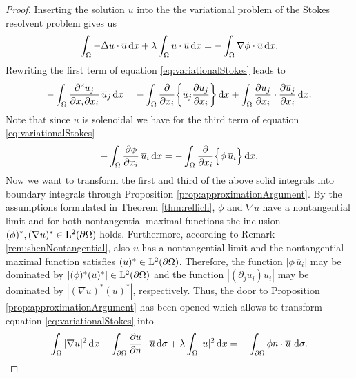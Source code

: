 \begin{proof}
  Inserting the solution $u$ into the the variational problem of the Stokes resolvent problem gives us
  \begin{align}
    \label{eq:variationalStokes}
    \int_\Omega -\Delta u \cdot \overline u \, {\operatorname{d}\!{x}} + \lambda \int_\Omega u \cdot \overline u \, {\operatorname{d}\!{x}}= - \int_\Omega \nabla \phi \cdot \overline u \, {\operatorname{d}\!{x}}.
  \end{align}
  Rewriting the first term of equation \eqref{eq:variationalStokes} leads to 
  \begin{align*}
    -\int_{\Omega}  \frac{\partial^2 u_j}{\partial x_i \partial x_i}  \, \overline u_j \, {\operatorname{d}\!{x}}
    = -\int_{\Omega}  \frac{\partial }{\partial x_i} \bigg\{ \overline u_j \frac{\partial u_j}{\partial x_i} \bigg\} \, {\operatorname{d}\!{x}} + \int_\Omega \frac{\partial u_j}{\partial x_i} \cdot \frac{\partial \overline u_j}{\partial x_i} \, {\operatorname{d}\!{x}}.
    \end{align*}
  Note that since $u$ is solenoidal we have for the third term of equation \eqref{eq:variationalStokes}
  \begin{align*}
    - \int_{\Omega} \frac{\partial \phi}{\partial x_i} \, \overline u_i \, {\operatorname{d}\!{x}} = - \int_{\Omega} \frac{\partial}{\partial x_i} \Big\{ \phi\,  \overline u_i \Big\} \, {\operatorname{d}\!{x}}.
  \end{align*}
  Now we want to transform the first and third of the above solid integrals into boundary integrals through Proposition \ref{prop:approximationArgument}.
  By the assumptions formulated in Theorem \ref{thm:rellich}, $\phi$ and $\nabla u$ have a nontangential limit and for both nontangential maximal functions the inclusion $(\phi)^*, (\nabla u)^* \in \mathrm{L}^2(\partial\Omega)$ holds. 
  Furthermore, according to Remark \ref{rem:shenNontangential}, also $u$ has a nontangential limit and the nontangential maximal function satisfies $(u)^* \in \mathrm{L}^2(\partial\Omega)$. 
  Therefore, the function $|\phi\,  \overline u_i |$ may be dominated by $|(\phi)^* (u)^*| \in \mathrm{L}^2(\partial\Omega)$ and the function $|(\partial_j u_i) u_i|$ may be dominated by $|(\nabla u)^* (u)^*|$, respectively. Thus, the door to Proposition \ref{prop:approximationArgument} has been opened which allows to transform equation \eqref{eq:variationalStokes} into
  \begin{align*}
    \int_\Omega |\nabla u|^2 \, {\operatorname{d}\!{x}} - \int_{\partial\Omega} \frac{\partial u}{\partial n} \cdot \overline u \, {\operatorname{d}\!{\sigma}} + \lambda \int_\Omega |u|^2 \, {\operatorname{d}\!{x}} = - \int_{\partial\Omega}  \phi n \cdot \overline u \, \, {\operatorname{d}\!{\sigma}}.
  \end{align*}

\end{proof}
